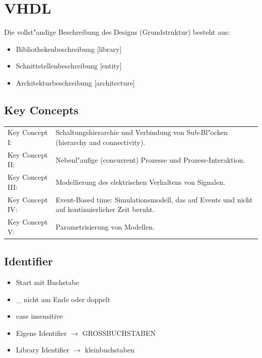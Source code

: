 \section{VHDL}
	Die vollst"andige Beschreibung des Designs (Grundstruktur) besteht aus:\\
	\begin{itemize}
	\setlength{\itemsep}{0pt}
  	\setlength{\parskip}{0pt}
  	\setlength{\parsep}{0pt}
		\item Bibliothekenbeschreibung [library]
		\item Schnittstellenbeschreibung [entity]
		\item Architekturbeschreibung [architecture]
	\end{itemize}

	\subsection{Key Concepts}
		\begin{tabular}{ll}
			Key Concept I: & Schaltungshierarchie und Verbindung von Sub-Bl"ocken 
				(hierarchy and connectivity).\\
			Key Concept II: & Nebenl"aufige (concurrent) Prozesse und Prozess-Interaktion.\\
			Key Concept III: & Modellierung des elektrischen Verhaltens von Signalen.\\
			Key Concept IV: & Event-Based time: Simulationsmodell, das auf Events und nicht 
				auf kontinuierlicher Zeit beruht.\\
			Key Concept V: & Parametrisierung von Modellen.
		\end{tabular}
	\subsection{Identifier}
		\begin{itemize}
			\setlength{\itemsep}{0pt}
  			\setlength{\parskip}{0pt}
  			\setlength{\parsep}{0pt}
				\item Start mit Buchstabe
				\item \_ nicht am Ende oder doppelt
				\item case insensitive
				\item Eigene Identifier $\rightarrow$ GROSSBUCHSTABEN
				\item Library Identifier $\rightarrow$ kleinbuchstaben
		\end{itemize}


